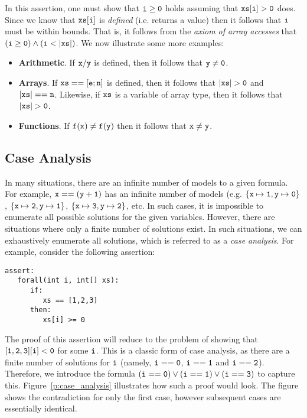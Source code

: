 In this assertion, one must show that ${\tt i \ge 0}$ holds assuming
that ${\tt xs[i] > 0}$ does.  Since we know that ${\tt xs[i]}$ is {\em
  defined} (i.e. returns a value) then it follows that ${\tt i}$ must
be within bounds.  That is, it follows from the {\em axiom of array
  accesses} that ${\tt (i \ge 0)\land(i < |xs|)}$.  We now illustrate
some more examples:

\begin{itemize}
\item {\bf Arithmetic}.  If ${\tt x / y}$ is defined, then it follows
  that ${\tt y \neq 0}$.
\item {\bf Arrays}.  If ${\tt xs==[e;n]}$ is defined, then it follows
  that ${\tt |xs| > 0}$ and ${\tt |xs| == n}$.  Likewise, if
  ${\tt xs}$ is a variable of array type, then it follows that
  ${\tt |xs| > 0}$.
\item {\bf Functions}.  If ${\tt f(x) \neq f(y)}$ then it follows that
  ${\tt x\neq y}$.
\end{itemize}

\subsection{Case Analysis}

In many situations, there are an infinite number of models to a given
formula.  For example, ${\tt x == (y + 1)}$ has an infinite number of
models (e.g. ${\tt\{x\mapsto 1, y\mapsto 0\}}$,
${\tt\{x\mapsto 2, y\mapsto 1\}}$, ${\tt\{x\mapsto 3, y\mapsto 2\}}$, etc.
In such cases, it is impossible to enumerate all possible solutions
for the given variables.  However, there are situations where only a
finite number of solutions exist.  In such situations, we can
exhaustively enumerate all solutions, which is referred to as a {\em
  case analysis}.  For example, consider the following assertion:

\begin{lstlisting}[language=WyAL]
assert:
   forall(int i, int[] xs):
      if:
         xs == [1,2,3]
      then:
         xs[i] >= 0
\end{lstlisting}

The proof of this assertion will reduce to the problem of showing that
${\tt [1,2,3][i] < 0}$ for some ${\tt i}$.  This is a classic form of
case analysis, as there are a finite number of solutions for ${\tt i}$
(namely, ${\tt i==0}$, ${\tt i==1}$ and ${\tt i==2}$).  Therefore, we
introduce the formula ${\tt (i==0)\lor(i==1)\lor(i==3)}$ to capture
this.  Figure~\ref{p:case_analysis} illustrates how such a proof would
look.  The figure shows the contradiction for only the first case,
however subsequent cases are essentially identical.

